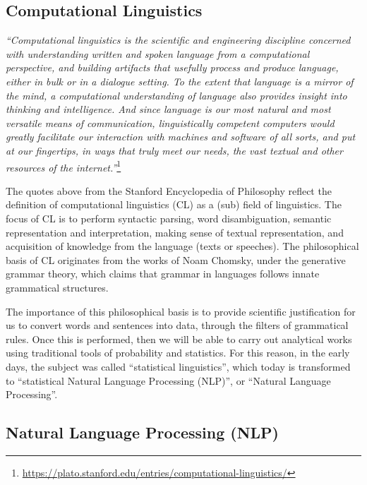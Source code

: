 \documentclass[
]{article}
\begin{document}
\hypertarget{computational-linguistics}{%
\subsection{Computational Linguistics}\label{computational-linguistics}}

\emph{``Computational linguistics is the scientific and engineering discipline concerned with understanding written and spoken language from a computational perspective, and building artifacts that usefully process and produce language, either in bulk or in a dialogue setting. To the extent that language is a mirror of the mind, a computational understanding of language also provides insight into thinking and intelligence. And since language is our most natural and most versatile means of communication, linguistically competent computers would greatly facilitate our interaction with machines and software of all sorts, and put at our fingertips, in ways that truly meet our needs, the vast textual and other resources of the internet.''}\footnote{\url{https://plato.stanford.edu/entries/computational-linguistics/}}

The quotes above from the Stanford Encyclopedia of Philosophy reflect the definition of computational linguistics (CL) as a (sub) field of linguistics. The focus of CL is to perform syntactic parsing, word disambiguation, semantic representation and interpretation, making sense of textual representation, and acquisition of knowledge from the language (texts or speeches). The philosophical basis of CL originates from the works of Noam Chomsky, under the generative grammar theory, which claims that grammar in languages follows innate grammatical structures.

The importance of this philosophical basis is to provide scientific justification for us to convert words and sentences into data, through the filters of grammatical rules. Once this is performed, then we will be able to carry out analytical works using traditional tools of probability and statistics. For this reason, in the early days, the subject was called ``statistical linguistics'', which today is transformed to ``statistical Natural Language Processing (NLP)'', or ``Natural Language Processing''.

\hypertarget{natural-language-processing}{%
\subsection{Natural Language Processing (NLP)}\label{natural-language-processing}}
\end{document}
